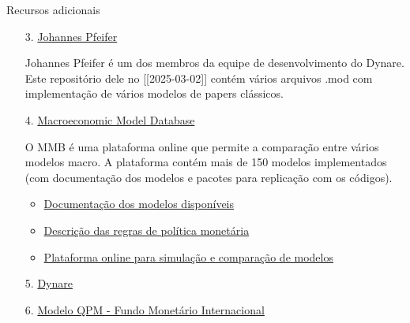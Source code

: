 \documentclass[10pt]{beamer}
\begin{document}
\begin{frame}{Recursos adicionais}
    \begin{enumerate}
        \item[3.] \href{https://github.com/JohannesPfeifer/DSGE_mod}{Johannes Pfeifer}\medskip
        
        Johannes Pfeifer é um dos membros da equipe de desenvolvimento do Dynare. Este repositório dele no [[2025-03-02]] contém vários arquivos .mod com implementação de vários modelos de papers clássicos.\medskip

        \item[4.] \href{https://www.macromodelbase.com/}{Macroeconomic Model Database}
        
        O MMB é uma plataforma online que permite a comparação entre vários modelos macro. A plataforma contém mais de 150 modelos implementados (com documentação dos modelos e pacotes para replicação com os códigos).\medskip
        \begin{itemize}
            \item \href{https://www.macromodelbase.com/files/documentation_source/mmb-model-description.pdf}{Documentação dos modelos disponíveis}\medskip
            \item \href{https://www.macromodelbase.com/files/mmb-mprule-description.pdf}{Descrição das regras de política monetária}\medskip            
            \item \href{https://ocp.macromodelbase.com/}{Plataforma online para simulação e comparação de modelos}\medskip           
        \end{itemize}

        \item[5.] \href{https://www.dynare.org/}{Dynare}\medskip
        \item[6.] \href{https://www.imf.org/en/Capacity-Development/Training/ICDTC/Courses/MPAFx}{Modelo QPM - Fundo Monetário Internacional} 
    \end{enumerate}
\end{frame}
\end{document}
